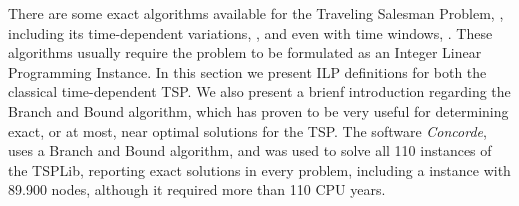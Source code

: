
There are some exact algorithms available for the Traveling Salesman Problem, \cite{tsp_exact_review},
including its time-dependent variations, \cite{tdtwptw_exact}, and even 
with time windows, \cite{tsptw_soloman}. These algorithms usually require 
the problem to be formulated as an Integer Linear Programming Instance.
In this section we present ILP definitions for both the classical time-dependent TSP.
We also present a brienf introduction regarding the Branch and Bound algorithm,
which has proven to be very useful for determining exact, or at most, near optimal solutions
for the TSP. The software \textit{Concorde}, uses a Branch and Bound algorithm,
and was used to solve all 110 instances of the TSPLib, reporting exact solutions in every problem,
including a instance with 89.900 nodes, although it required more than 110 CPU years.



